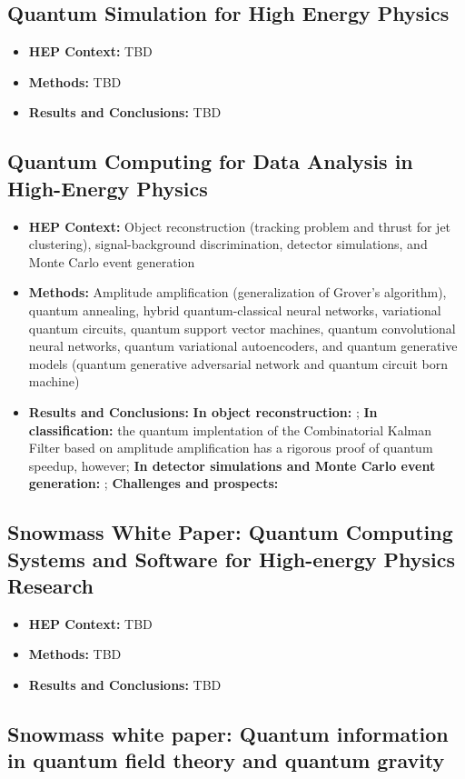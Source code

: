 \subsection{Quantum Simulation for High Energy Physics~\cite{Bauer:2022hpo}}
\begin{itemize}
	\item \textbf{HEP Context: }TBD
	\item \textbf{Methods: }TBD
	\item \textbf{Results and Conclusions: }TBD
\end{itemize}\subsection{Quantum Computing for Data Analysis in High-Energy Physics~\cite{Delgado:2022tpc}}
\begin{itemize}
	\item \textbf{HEP Context: }Object reconstruction (tracking problem and  thrust for jet clustering), signal-background discrimination, detector simulations, and Monte Carlo event generation
	\item \textbf{Methods: }Amplitude amplification (generalization of Grover's algorithm), quantum annealing, hybrid quantum-classical neural networks, variational quantum circuits, quantum support vector machines, quantum convolutional neural networks, quantum variational autoencoders, and quantum generative models (quantum generative adversarial network and quantum circuit born machine)
	\item \textbf{Results and Conclusions: }\textbf{In object reconstruction:} ; \textbf{In classification:} the quantum implentation of the Combinatorial Kalman Filter based on amplitude amplification has a rigorous proof of quantum speedup, however; \textbf{In detector simulations and Monte Carlo event generation:} ; \textbf{Challenges and prospects:} 
\end{itemize}\subsection{Snowmass White Paper: Quantum Computing Systems and Software for High-energy Physics Research~\cite{Humble:2022vtm}}
\begin{itemize}
	\item \textbf{HEP Context: }TBD
	\item \textbf{Methods: }TBD
	\item \textbf{Results and Conclusions: }TBD
\end{itemize}\subsection{Snowmass white paper: Quantum information in quantum field theory and quantum gravity~\cite{Faulkner:2022mlp}}

